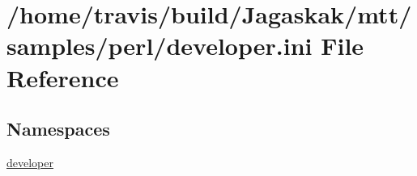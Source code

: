 \hypertarget{developer_8ini}{\section{/home/travis/build/\-Jagaskak/mtt/samples/perl/developer.ini File Reference}
\label{developer_8ini}
}
\subsection*{Namespaces}
\begin{DoxyCompactItemize}
\item 
\hyperlink{namespacedeveloper}{developer}
\end{DoxyCompactItemize}

